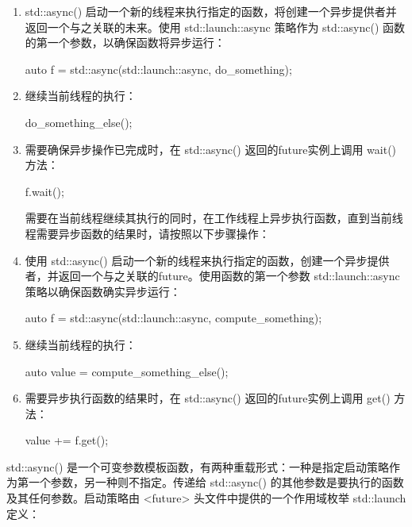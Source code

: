 \begin{enumerate}
\item
std::async() 启动一个新的线程来执行指定的函数，将创建一个异步提供者并返回一个与之关联的未来。使用 std::launch::async 策略作为 std::async() 函数的第一个参数，以确保函数将异步运行：

\begin{cpp}
auto f = std::async(std::launch::async, do_something);
\end{cpp}

\item
继续当前线程的执行：

\begin{cpp}
do_something_else();
\end{cpp}

\item
需要确保异步操作已完成时，在 std::async() 返回的future实例上调用 wait() 方法：

\begin{cpp}
f.wait();
\end{cpp}

需要在当前线程继续其执行的同时，在工作线程上异步执行函数，直到当前线程需要异步函数的结果时，请按照以下步骤操作：

\item
使用 std::async() 启动一个新的线程来执行指定的函数，创建一个异步提供者，并返回一个与之关联的future。使用函数的第一个参数 std::launch::async 策略以确保函数确实异步运行：

\begin{cpp}
auto f = std::async(std::launch::async, compute_something);
\end{cpp}

\item
继续当前线程的执行：

\begin{cpp}
auto value = compute_something_else();
\end{cpp}

\item
需要异步执行函数的结果时，在 std::async() 返回的future实例上调用 get() 方法：

\begin{cpp}
value += f.get();
\end{cpp}
\end{enumerate}


std::async() 是一个可变参数模板函数，有两种重载形式：一种是指定启动策略作为第一个参数，另一种则不指定。传递给 std::async() 的其他参数是要执行的函数及其任何参数。启动策略由 <future> 头文件中提供的一个作用域枚举 std::launch 定义：

